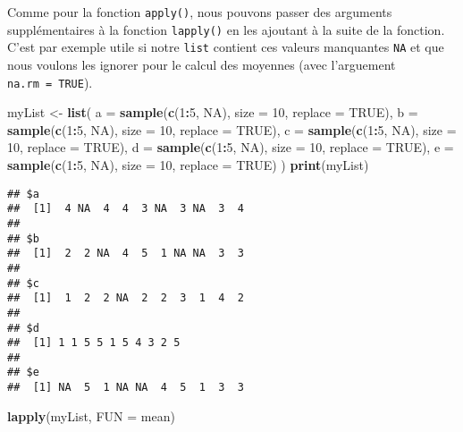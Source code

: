 \documentclass[]{book}
\newenvironment{Shaded}{\begin{snugshade}}{\end{snugshade}}
\newcommand{\KeywordTok}[1]{\textcolor[rgb]{0.13,0.29,0.53}{\textbf{#1}}}
\newcommand{\DataTypeTok}[1]{\textcolor[rgb]{0.13,0.29,0.53}{#1}}
\newcommand{\DecValTok}[1]{\textcolor[rgb]{0.00,0.00,0.81}{#1}}
\newcommand{\StringTok}[1]{\textcolor[rgb]{0.31,0.60,0.02}{#1}}
\newcommand{\OtherTok}[1]{\textcolor[rgb]{0.56,0.35,0.01}{#1}}
\newcommand{\OperatorTok}[1]{\textcolor[rgb]{0.81,0.36,0.00}{\textbf{#1}}}
\newcommand{\NormalTok}[1]{#1}
\theoremstyle{definition}
\theoremstyle{definition}
\theoremstyle{definition}
\theoremstyle{remark}
\begin{document}
Comme pour la fonction \texttt{apply()}, nous pouvons passer des
arguments supplémentaires à la fonction \texttt{lapply()} en les
ajoutant à la suite de la fonction. C'est par exemple utile si notre
\texttt{list} contient ces valeurs manquantes \texttt{NA} et que nous
voulons les ignorer pour le calcul des moyennes (avec l'arguement
\texttt{na.rm\ =\ TRUE}).

\begin{Shaded}
\begin{Highlighting}[]
\NormalTok{myList <-}\StringTok{ }\KeywordTok{list}\NormalTok{(}
  \DataTypeTok{a =} \KeywordTok{sample}\NormalTok{(}\KeywordTok{c}\NormalTok{(}\DecValTok{1}\OperatorTok{:}\DecValTok{5}\NormalTok{, }\OtherTok{NA}\NormalTok{), }\DataTypeTok{size =} \DecValTok{10}\NormalTok{, }\DataTypeTok{replace =} \OtherTok{TRUE}\NormalTok{), }
  \DataTypeTok{b =} \KeywordTok{sample}\NormalTok{(}\KeywordTok{c}\NormalTok{(}\DecValTok{1}\OperatorTok{:}\DecValTok{5}\NormalTok{, }\OtherTok{NA}\NormalTok{), }\DataTypeTok{size =} \DecValTok{10}\NormalTok{, }\DataTypeTok{replace =} \OtherTok{TRUE}\NormalTok{), }
  \DataTypeTok{c =} \KeywordTok{sample}\NormalTok{(}\KeywordTok{c}\NormalTok{(}\DecValTok{1}\OperatorTok{:}\DecValTok{5}\NormalTok{, }\OtherTok{NA}\NormalTok{), }\DataTypeTok{size =} \DecValTok{10}\NormalTok{, }\DataTypeTok{replace =} \OtherTok{TRUE}\NormalTok{), }
  \DataTypeTok{d =} \KeywordTok{sample}\NormalTok{(}\KeywordTok{c}\NormalTok{(}\DecValTok{1}\OperatorTok{:}\DecValTok{5}\NormalTok{, }\OtherTok{NA}\NormalTok{), }\DataTypeTok{size =} \DecValTok{10}\NormalTok{, }\DataTypeTok{replace =} \OtherTok{TRUE}\NormalTok{), }
  \DataTypeTok{e =} \KeywordTok{sample}\NormalTok{(}\KeywordTok{c}\NormalTok{(}\DecValTok{1}\OperatorTok{:}\DecValTok{5}\NormalTok{, }\OtherTok{NA}\NormalTok{), }\DataTypeTok{size =} \DecValTok{10}\NormalTok{, }\DataTypeTok{replace =} \OtherTok{TRUE}\NormalTok{)}
\NormalTok{)}
\KeywordTok{print}\NormalTok{(myList)}
\end{Highlighting}
\end{Shaded}

\begin{verbatim}
## $a
##  [1]  4 NA  4  4  3 NA  3 NA  3  4
## 
## $b
##  [1]  2  2 NA  4  5  1 NA NA  3  3
## 
## $c
##  [1]  1  2  2 NA  2  2  3  1  4  2
## 
## $d
##  [1] 1 1 5 5 1 5 4 3 2 5
## 
## $e
##  [1] NA  5  1 NA NA  4  5  1  3  3
\end{verbatim}

\begin{Shaded}
\begin{Highlighting}[]
\KeywordTok{lapply}\NormalTok{(myList, }\DataTypeTok{FUN =}\NormalTok{ mean)}
\end{Highlighting}
\end{Shaded}
\end{document}
